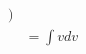 \documentclass[preview]{standalone}
\begin{document}
\begin{align*}
) \\ &=\int v dv
\end{align*}
\end{document}
